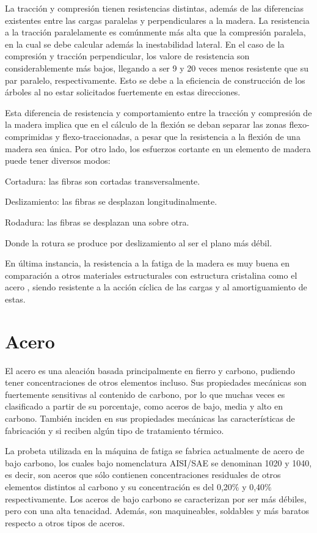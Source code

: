 La tracción y compresión tienen resistencias distintas, además de las diferencias existentes entre las cargas paralelas y perpendiculares a la madera. La resistencia a la tracción paralelamente es comúnmente más alta que la compresión paralela, en la cual se debe calcular además la inestabilidad lateral. En el caso de la compresión y tracción perpendicular, los valore de resistencia son considerablemente más bajos, llegando a ser 9 y 20 veces menos resistente que su par paralelo, respectivamente. Esto se debe a la eficiencia de construcción de los árboles al no estar solicitados fuertemente en estas direcciones. 

Esta diferencia de resistencia y comportamiento entre la tracción y compresión de la madera implica que en el cálculo de la flexión se deban separar las zonas flexo-comprimidas y flexo-traccionadas, a pesar que la resistencia a la flexión de una madera sea única. Por otro lado, los esfuerzos cortante en un elemento de madera puede tener diversos modos:
\begin{itemize*}
	\item Cortadura: las fibras son cortadas transversalmente.
	\item Deslizamiento: las fibras se desplazan longitudinalmente.
	\item Rodadura: las fibras se desplazan una sobre otra.
\end{itemize*}
Donde la rotura se produce por deslizamiento al ser el plano más débil.

En última instancia, la resistencia a la fatiga de la madera es muy buena en comparación a otros materiales estructurales con estructura cristalina como el acero \cite{sanchez2014guia}, siendo resistente a la acción cíclica de las cargas y al amortiguamiento de estas. 

\section{Acero}
El acero es una aleación basada principalmente en fierro y carbono, pudiendo tener concentraciones de otros elementos incluso. Sus propiedades mecánicas son fuertemente sensitivas al contenido de carbono, por lo que muchas veces es clasificado a partir de su porcentaje, como aceros de bajo, media y alto en carbono. También inciden en sus propiedades mecánicas las características de fabricación y si reciben algún tipo de tratamiento térmico.

La probeta utilizada en la máquina de fatiga se fabrica actualmente de acero de bajo carbono, los cuales bajo nomenclatura AISI/SAE se denominan 1020 y 1040, es decir, son aceros que sólo contienen concentraciones residuales de otros elementos distintos al carbono y su concentración es del 0,20\% y 0,40\% respectivamente. Los aceros de bajo carbono se caracterizan por ser más débiles, pero con una alta tenacidad. Además, son maquineables, soldables y más baratos respecto a otros tipos de aceros.

